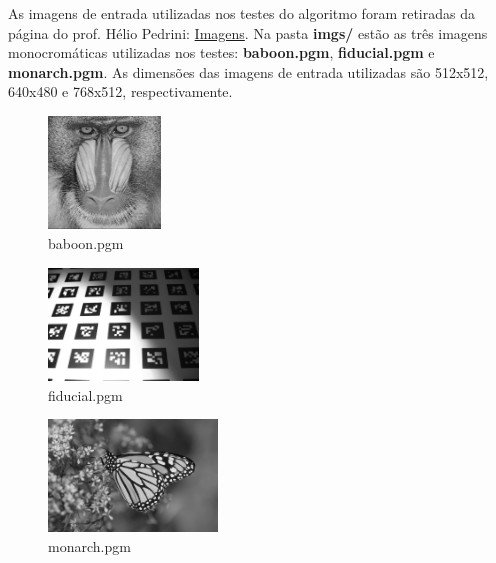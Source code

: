 \documentclass[twoside,twocolumn]{article}
\begin{document}
As imagens de entrada utilizadas nos testes do algoritmo foram retiradas da página do prof. Hélio Pedrini: \href{http://www.ic.unicamp.br/~helio/imagens_pgm/}{Imagens}. Na pasta \textbf{imgs/} estão as três imagens monocromáticas utilizadas nos testes: \textbf{baboon.pgm}, \textbf{fiducial.pgm} e \textbf{monarch.pgm}. As dimensões das imagens de entrada utilizadas são 512x512, 640x480 e 768x512, respectivamente.

\begin{figure}[H]
\begin{center}
	\includegraphics[height=3cm]{figures/baboon.png}
\caption{baboon.pgm} \label{gdimotes}
\end{center}
\end{figure}

\begin{figure}[H]
\begin{center}
	\includegraphics[height=3cm]{figures/fiducial.png}
\caption{fiducial.pgm} \label{gdimotes}
\end{center}
\end{figure}

\begin{figure}[H]
\begin{center}
	\includegraphics[height=3cm]{figures/monarch.png}
\caption{monarch.pgm} \label{gdimotes}
\end{center}
\end{figure}

\end{document}
